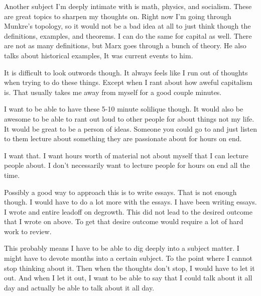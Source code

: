 \documentclass{article}
\begin{document}
Another subject I'm deeply intimate with is math, physics, and socialism. These are great topics to sharpen my thoughts on. Right now I'm going through Munkre's topology, so it would not be a bad idea at all to just think though the definitions, examples, and theorems. I can do the same for capital as well. There are not as many definitions, but Marx goes through a bunch of theory. He also talks about historical examples, It was current events to him. 

It is difficult to look outwords though. It always feels like I run out of thoughts when trying to do these things. Except when I rant about how aweful capitalism is. That usually takes me away from myself for a good couple minutes. 

I want to be able to have these 5-10 minute solilique though. It would also be awesome to be able to rant out loud to other people for about things not my life. It would be great to be a person of ideas. Someone you could go to and just listen to them lecture about something they are passionate about for hours on end.

I want that. I want hours worth of material not about myself that I can lecture people about. I don't necessarily want to lecture people for hours on end all the time. 

Possibly a good way to approach this is to write essays. That is not enough though. I would have to do a lot more with the essays. I have been writing essays. I wrote and entire leadoff on degrowth. This did not lead to the desired outcome that I wrote on above. To get that desire outcome would require a lot of hard work to review.

This probably means I have to be able to dig deeply into a subject matter. I might have to devote months into a certain subject. To the point where I cannot stop thinking about it. Then when the thoughts don't stop, I would have to let it out. And when I let it out, I want to be able to say that I could talk about it all day and actually be able to talk about it all day.
\end{document}
